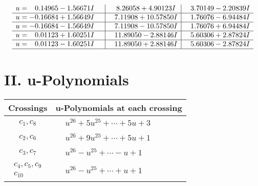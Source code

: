 \documentclass[1p]{elsarticle_modified}
\theoremstyle{definition}
\begin{document}
$$\begin{array}{c|c|c}
\begin{aligned}
u &= \phantom{-}0.14965 - 1.56671 I\end{aligned}
 & \phantom{-}8.26058 + 4.90123 I & \phantom{-}3.70149 - 2.20839 I \\ \hline\begin{aligned}
u &= -0.16684 + 1.56649 I\end{aligned}
 & \phantom{-}7.11908 + 10.57850 I & \phantom{-}1.76076 - 6.94484 I \\ \hline\begin{aligned}
u &= -0.16684 - 1.56649 I\end{aligned}
 & \phantom{-}7.11908 - 10.57850 I & \phantom{-}1.76076 + 6.94484 I \\ \hline\begin{aligned}
u &= \phantom{-}0.01123 + 1.60251 I\end{aligned}
 & \phantom{-}11.89050 - 2.88146 I & \phantom{-}5.60306 + 2.87824 I \\ \hline\begin{aligned}
u &= \phantom{-}0.01123 - 1.60251 I\end{aligned}
 & \phantom{-}11.89050 + 2.88146 I & \phantom{-}5.60306 - 2.87824 I\\
 \hline 
 \end{array}$$\newpage
\newpage\renewcommand{\arraystretch}{1}
\centering \section*{ II. u-Polynomials}
\begin{tabular}{m{50pt}|m{274pt}}
Crossings & \hspace{64pt}u-Polynomials at each crossing \\
\hline $$\begin{aligned}c_{1},c_{8}\end{aligned}$$&$\begin{aligned}
&u^{26}+5 u^{25}+\cdots+5 u+3
\end{aligned}$\\
\hline $$\begin{aligned}c_{2},c_{6}\end{aligned}$$&$\begin{aligned}
&u^{26}+9 u^{25}+\cdots+5 u+1
\end{aligned}$\\
\hline $$\begin{aligned}c_{3},c_{7}\end{aligned}$$&$\begin{aligned}
&u^{26}- u^{25}+\cdots- u+1
\end{aligned}$\\
\hline $$\begin{aligned}c_{4},c_{5},c_{9}\\c_{10}\end{aligned}$$&$\begin{aligned}
&u^{26}- u^{25}+\cdots+u+1
\end{aligned}$\\
\hline
\end{tabular}\newpage\renewcommand{\arraystretch}{1}
\end{document}

